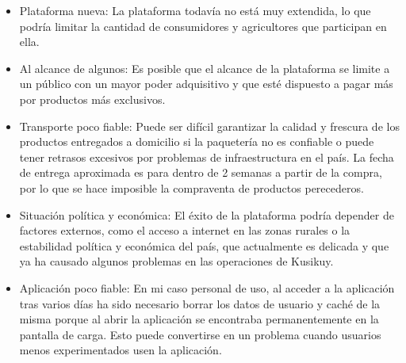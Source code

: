 \begin{itemize}

	\item Plataforma nueva: La plataforma todavía no está muy extendida, lo que podría limitar la cantidad de consumidores y agricultores que participan en ella.

	\item Al alcance de algunos: Es posible que el alcance de la plataforma se limite a un público con un mayor poder adquisitivo y que esté dispuesto a pagar más por productos más exclusivos.
	
	\item Transporte poco fiable: Puede ser difícil garantizar la calidad y frescura de los productos entregados a domicilio si la paquetería no es confiable o puede tener retrasos excesivos por problemas de infraestructura en el país. La fecha de entrega aproximada es para dentro de 2 semanas a partir de la compra, por lo que se hace imposible la compraventa de productos perecederos.
	
	\item Situación política y económica: El éxito de la plataforma podría depender de factores externos, como el acceso a internet en las zonas rurales o la estabilidad política y económica del país, que actualmente es delicada y que ya ha causado algunos problemas en las operaciones de Kusikuy.

	\item Aplicación poco fiable: En mi caso personal de uso, al acceder a la aplicación tras varios días ha sido necesario borrar los datos de usuario y caché de la misma porque al abrir la aplicación se encontraba permanentemente en la pantalla de carga. Esto puede convertirse en un problema cuando usuarios menos experimentados usen la aplicación.

\end{itemize}















